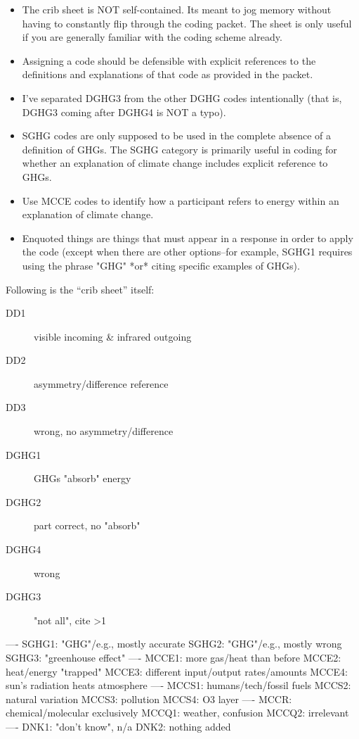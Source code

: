 \begin{itemize}
\item The crib sheet is NOT self-contained. Its meant to jog memory
without having to constantly flip through the coding packet. The sheet
is only useful if you are generally familiar with the coding scheme
already.

\item Assigning a code should be defensible with explicit references to
the definitions and explanations of that code as provided in the
packet.

\item I've separated DGHG3 from the other DGHG codes intentionally (that
is, DGHG3 coming after DGHG4 is NOT a typo).

\item SGHG codes are only supposed to be used in the complete absence of a
definition of GHGs. The SGHG category is primarily useful in coding
for whether an explanation of climate change includes explicit
reference to GHGs.

\item Use MCCE codes to identify how a participant refers to energy within
an explanation of climate change.

\item Enquoted things are things that must appear in a response in order
to apply the code (except when there are other options--for example,
SGHG1 requires using the phrase "GHG" *or* citing specific examples of
GHGs).
\end{itemize}

Following is the “crib sheet” itself:

\begin{description}
\item[DD1] visible incoming \& infrared outgoing
\item[DD2] asymmetry/difference reference
\item[DD3] wrong, no asymmetry/difference
\item[DGHG1] GHGs "absorb" energy
\item[DGHG2] part correct, no "absorb"
\item[DGHG4] wrong
\item[DGHG3] "not all", cite >1
\end{description}
----
SGHG1: "GHG"/e.g., mostly accurate
SGHG2: "GHG"/e.g., mostly wrong
SGHG3: "greenhouse effect"
----
MCCE1: more gas/heat than before
MCCE2: heat/energy "trapped"
MCCE3: different input/output rates/amounts
MCCE4: sun's radiation heats atmosphere
----
MCCS1: humans/tech/fossil fuels
MCCS2: natural variation
MCCS3: pollution
MCCS4: O3 layer
----
MCCR: chemical/molecular exclusively
MCCQ1: weather, confusion
MCCQ2: irrelevant
----
DNK1: "don't know", n/a
DNK2: nothing added
